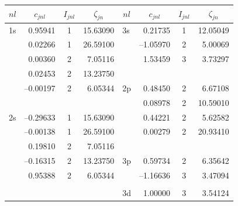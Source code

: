 \begin{table}[hbt]
\footnotesize
\begin{center}
\begin{tabular}{@{}        l r c r     |      l r c r        @{}}
\toprule
\multicolumn{1}{c}{$nl$} & \multicolumn{1}{c}{$c_{jnl}$} & \multicolumn{1}{c}{$I_{jnl}$} & \multicolumn{1}{c}{$\zeta_{jn}$} & \multicolumn{1}{c}{$nl$} & \multicolumn{1}{c}{$c_{jnl}$} & \multicolumn{1}{c}{$I_{jnl}$} & \multicolumn{1}{c}{$\zeta_{jn}$} \\  

\toprule
    \multicolumn{1}{c}{1s} & 0.95941    & 1 & 15.63090   & 3s  & 0.21735   & 1 & 12.05049\\     
                                            & 0.02266    & 1 & 26.59100   &       & --1.05970 & 2 & 5.00069 \\  
                                            & 0.00360    & 2 & 7.05116     &       & 1.53459   & 3 & 3.73297 \\                                                                    
                                            & 0.02453    & 2 & 13.23750   &       &                  &     & \\
                                            & --0.00197  & 2 & 6.05344     & 2p & 0.48450   & 2 & 6.67108\\
                                            &                    &    &                    &       & 0.08978   & 2 & 10.59010  \\
    \multicolumn{1}{c}{2s} & --0.29633  & 1 & 15.63090  &       & 0.44221   & 2 & 5.62582\\  
                                            & --0.00138  & 1 & 26.59100  &       & 0.00279   & 2 & 20.93410\\                                                                                                                                   
                                            & 0.19810    & 2 & 7.05116    &       &                  &     & \\   
                                            & --0.16315  & 2 & 13.23750  & 3p  & 0.59734   & 2 & 6.35642\\ 
                                            & 0.95388    & 2 & 6.05344    &         & --1.16636 & 3 & 3.47094 \\ 
                                            &                    &    &                   &       &                  &     & \\       
                                            &                    &    &                   &  3d  & 1.00000   & 3 & 3.54124\\


\end{tabular}
\end{center}
\end{table}
